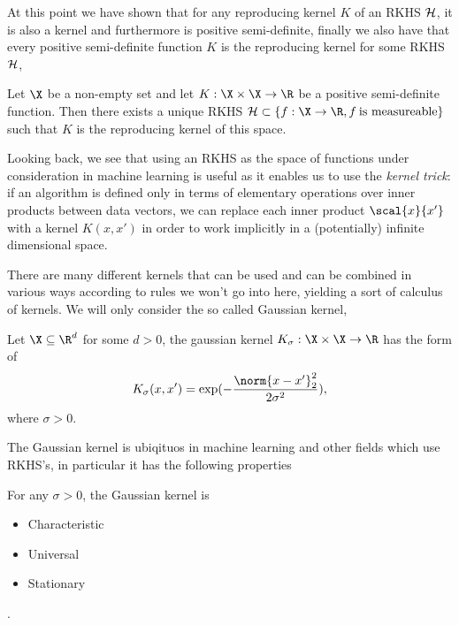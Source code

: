 At this point we have shown that for any reproducing kernel \(K\) of an RKHS
\(\mathcal{H}\), it is also a kernel and furthermore is positive semi-definite,
finally we also have that every positive semi-definite function \(K\) is the
reproducing kernel for some RKHS \(\mathcal{H}\),
\begin{theorem}
\label{thm:moore-aronszajn-pos-def-function-is-rep-kernel} Let \(\X\) be a
non-empty set and let \(K: \X \times \X \to \R\) be a positive semi-definite
function. Then there exists a unique RKHS \(\rkhs{H} \subset \{f : \X \to \R, f
\: \textrm{is measureable}\}\) such that \(K\) is the reproducing kernel of this
space.
\end{theorem}

Looking back, we see that using an RKHS as the space of functions under
consideration in machine learning is useful as it enables us to use the
\emph{kernel trick}: if an algorithm is defined only in terms of elementary
operations over inner products between data vectors, we can replace each inner
product \(\scal{x}{x'}\) with a kernel \(K(x, x')\) in order to work implicitly
in a (potentially) infinite dimensional space.

There are many different kernels that can be used and can be combined in various
ways according to rules we won't go into here, yielding a sort of calculus of
kernels. We will only consider the so called Gaussian kernel,
\begin{definition}
  \label{def:gaussian-kernel} Let \(\X \subseteq \R^d\) for some \(d > 0\), the
gaussian kernel \(K_{\sigma} : \X \times \X \to \R\) has the form of
  \begin{equation}
    \label{eq:gaussian-kernel} K_{\sigma}(x, x') = \exp(-\frac{\norm{x -
x'}_2^2}{2\sigma^2}),
  \end{equation} where \(\sigma > 0\).
\end{definition}

The Gaussian kernel is ubiqituos in machine learning and other fields which use
RKHS's, in particular it has the following properties
\begin{theorem}
  \label{th:gaussian-kernel-properties} For any \(\sigma > 0\), the Gaussian
kernel is
  \begin{itemize}
  \item Characteristic
  \item Universal
  \item Stationary
  \end{itemize} .
\end{theorem}

